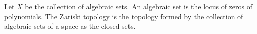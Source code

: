 \begin{example}
    \label{example-zariski}
    Let $X$ be the collection of algebraic sets.
    An algebraic set is the locus of zeros of polynomials.
    The Zariski topology is the topology formed by the collection of algebraic sets of a space as the closed sets.
\end{example} 